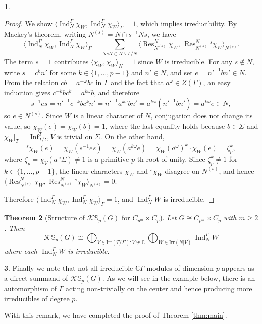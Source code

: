 \documentclass[12pt]{article}
\theoremstyle{plain}
\newtheorem{theorem}{Theorem}[section]
\theoremstyle{definition}
\newtheorem{nothing}[theorem]{}
\newcommand{\kerlin}{\mathbb S_p}
\newcommand{\ind}{\operatorname{Ind}}
\newcommand{\res}{\operatorname{Res}}
\newcommand{\infl}{\operatorname{Inf}}
\begin{document}
\begin{nothing}
\begin{proof}
We show $\langle \ind_N^\Gamma \chi_W, \ind_N^\Gamma \chi_W \rangle_\Gamma = 1$, which implies 
irreducibility. By Mackey's theorem, writing $N^{(s)} = N \cap s^{-1}Ns$, we have
\[
\langle \ind_N^\Gamma \chi_W, \ind_N^\Gamma \chi_W \rangle_\Gamma 
= \sum_{NsN \in N\backslash\Gamma/N} 
\langle \res^N_{N^{(s)}} \chi_W,\, \res^N_{N^{(s)}} {}^s\!\chi_W \rangle_{N^{(s)}}.
\]
The term $s = 1$ contributes $\langle \chi_W, \chi_W \rangle_N = 1$ since $W$ is irreducible.
For any $s \notin N$, write $s = c^k n'$ for some $k \in \{1, \ldots, p-1\}$ and $n' \in N$, 
and set $e = n'^{-1}bn' \in N$. From the relation $cb = a^{-\omega}bc$ in $\Gamma$ 
and the fact that $a^\omega \in Z(\Gamma)$, an easy induction gives $c^{-k}bc^k = a^{k\omega}b$,
and therefore
\[
s^{-1}es = n'^{-1}c^{-k}bc^k n' = n'^{-1}a^{k\omega}bn' = a^{k\omega}(n'^{-1}bn') = a^{k\omega}e \in N,
\]
so $e \in N^{(s)}$. Since $W$ is a linear character of $N$, conjugation does not change its 
value, so $\chi_W(e) = \chi_W(b) = 1$, where the last equality holds because 
$b \in \Sigma$ and $\chi_W|_T = \infl_{T/\Sigma}^T V$ is trivial on 
$\Sigma$. On the other hand,
\[
{}^s\!\chi_W(e) = \chi_W(s^{-1}es) = \chi_W(a^{k\omega}e) 
= \chi_W(a^\omega)^k \cdot \chi_W(e) = \zeta_p^k,
\]
where $\zeta_p = \chi_V(a^\omega\Sigma) \neq 1$ is a primitive $p$-th root of unity. Since 
$\zeta_p^k \neq 1$ for $k \in \{1,\ldots,p-1\}$, the linear characters $\chi_W$ and 
${}^s\!\chi_W$ disagree on $N^{(s)}$, and hence 
$\langle \res^N_{N^{(s)}} \chi_W, \res^N_{N^{(s)}} {}^s\!\chi_W \rangle_{N^{(s)}} = 0$.

Therefore $\langle \ind_N^\Gamma \chi_W, \ind_N^\Gamma \chi_W \rangle_\Gamma = 1$, 
and $\ind_N^\Gamma W$ is irreducible.
\end{proof}
    \end{nothing}

\begin{theorem}[Structure of \(\mathcal K\kerlin(G)\) for \(C_{p^m} \times C_p\)]
Let \(G \cong C_{p^m} \times C_p\) with \(m \geq 2\). Then
\[
\mathcal{K}\kerlin(G) \cong \bigoplus_{V\in\text{Irr}(T/\Sigma): V\not\cong \mathbb C} \bigoplus_{W\in \text{Irr}(N|V) }\ind_N^\Gamma W
\]
where each $\ind_N^\Gamma W$ is irreducible.  
\end{theorem}


\begin{nothing}
    Finally we note that not all irreducible $\mathbb C\Gamma$-modules of dimension $p$ appears as a direct summand of $\mathcal{K}\kerlin(G)$. As we will see in the example below, there is an automorphism of $\Gamma$ acting non-trivially on the center and hence producing more irreducibles of degree $p$. 

    With this remark, we have completed the proof of Theorem \ref{thm:main}.
    
\end{nothing}
\end{document}
